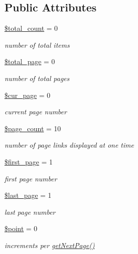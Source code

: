 \subsection*{Public Attributes}
\begin{DoxyCompactItemize}
\item 
\hyperlink{classPageHandler_ad0425a5e936db072a17956e4dada6f2b}{\$total\+\_\+count} = 0
\begin{DoxyCompactList}\small\item\em number of total items \end{DoxyCompactList}\item 
\hyperlink{classPageHandler_adfb101b1d69a89c65cbe405e5d2be0ad}{\$total\+\_\+page} = 0
\begin{DoxyCompactList}\small\item\em number of total pages \end{DoxyCompactList}\item 
\hyperlink{classPageHandler_acc2df2502fc0bcda4a9c9f9892e8581e}{\$cur\+\_\+page} = 0
\begin{DoxyCompactList}\small\item\em current page number \end{DoxyCompactList}\item 
\hyperlink{classPageHandler_a48a16aadd0c373c8856df7df954f90ff}{\$page\+\_\+count} = 10
\begin{DoxyCompactList}\small\item\em number of page links displayed at one time \end{DoxyCompactList}\item 
\hyperlink{classPageHandler_adee671fac811b630df2886a43108b5ff}{\$first\+\_\+page} = 1
\begin{DoxyCompactList}\small\item\em first page number \end{DoxyCompactList}\item 
\hyperlink{classPageHandler_ad0a035b1ac1f86fe173d5ea4e8c2bef7}{\$last\+\_\+page} = 1
\begin{DoxyCompactList}\small\item\em last page number \end{DoxyCompactList}\item 
\hyperlink{classPageHandler_a82a9b55cb98e79d46e6c6648cd2fca26}{\$point} = 0
\begin{DoxyCompactList}\small\item\em increments per \hyperlink{classPageHandler_a259d01838d005d854d4cc263ba524de7}{get\+Next\+Page()} \end{DoxyCompactList}\end{DoxyCompactItemize}


